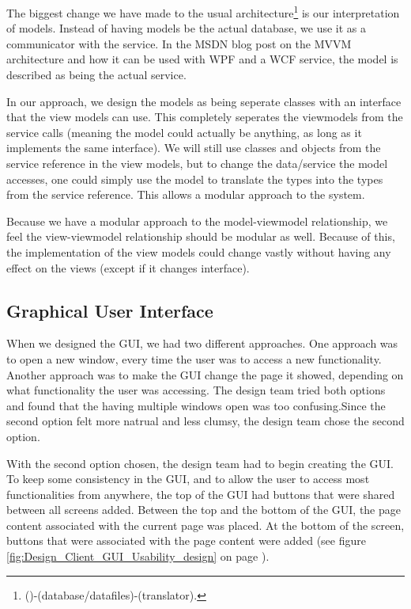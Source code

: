 The biggest change we have made to the usual architecture\footnote{()-(database/datafiles)-(translator).} is our interpretation of models. Instead of having models be the actual database, we use it as a communicator with the service. In the MSDN blog post on the MVVM architecture \cite{MSDN-WPF-MVVM} and how it can be used with WPF and a WCF service, the model is described as being the actual service. 

In our approach, we design the models as being seperate classes with an interface that the view models can use. This completely seperates the viewmodels from the service calls (meaning the model could actually be anything, as long as it implements the same interface). We will still use classes and objects from the service reference in the view models, but to change the data/service the model accesses, one could simply use the model to translate the types into the types from the service reference. This allows a modular approach to the system.

Because we have a modular approach to the model-viewmodel relationship, we feel the view-viewmodel relationship should be modular as well. Because of this, the implementation of the view models could change vastly without having any effect on the views (except if it changes interface).

\subsection{Graphical User Interface}
\label{Design_Client_GUI}
When we designed the GUI, we had two different approaches. One approach was to open a new window, every time the user was to access a new functionality. Another approach was to make the GUI change the page it showed, depending on what functionality the user was accessing. The design team tried both options and found that the having multiple windows open was too confusing.Since the second option felt more natrual and less clumsy, the design team chose the second option.

With the second option chosen, the design team had to begin creating the GUI. To keep some consistency in the GUI, and to allow the user to access most functionalities from anywhere, the top of the GUI had buttons that were shared between all screens added. Between the top and the bottom of the GUI, the page content associated with the current page was placed. At the bottom of the screen, buttons that were associated with the page content were added (see figure \ref{fig:Design_Client_GUI_Usability_design} on page \pageref{fig:Design_Client_GUI_Usability_design}).

